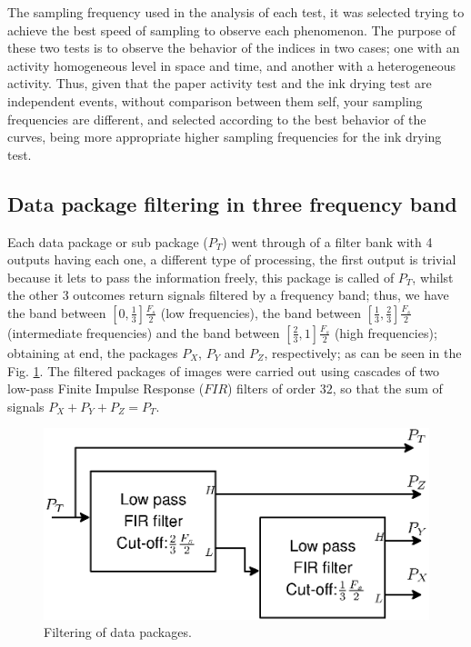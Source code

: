 \documentclass[review]{elsarticle}
\begin{document}
The sampling frequency used in the analysis of each test, 
it was selected  trying to achieve the best speed of sampling to observe each phenomenon. 
The purpose of these two tests is to observe the behavior of the indices in two cases; 
one with an activity homogeneous level in space and time, and another with a heterogeneous activity.
Thus, given that the paper activity test and the ink drying test are independent events, 
without comparison between them self, your sampling frequencies are different,
and selected according to the best behavior of the curves, 
being more appropriate higher sampling frequencies for the ink drying test.

\subsection{Data package filtering in three frequency band}
\label{subsec:firfilters}
Each data package or sub package ($P_T$) went through of a filter bank with 4 outputs  having each
one, a different type of processing, the first output is trivial because it
lets to pass the information freely, this package is called of $P_T$, whilst the other 3 outcomes
return  signals filtered by a frequency band; thus, 
we have the band between $[0,\frac{1}{3}]\frac{F_s}{2}$ (low frequencies),
the band between $[\frac{1}{3},\frac{2}{3}]\frac{F_s}{2}$ (intermediate frequencies) and
the band between $[\frac{2}{3},1]\frac{F_s}{2}$ (high frequencies); obtaining at end, the packages 
$P_X$, $P_Y$ and $P_Z$, respectively; as can be seen in the  Fig. \ref{fig:firfilters}.
The filtered packages of images were carried out using cascades
of two low-pass Finite Impulse Response ($FIR$) filters of order $32$, so that
the sum of signals $P_X+P_Y+P_Z=P_T$.
\begin{figure}[h!]
\centering
\includegraphics[width=0.55\columnwidth]{firfilters.eps}
\caption{Filtering of data packages.}
\label{fig:firfilters}
\end{figure}
\end{document}
